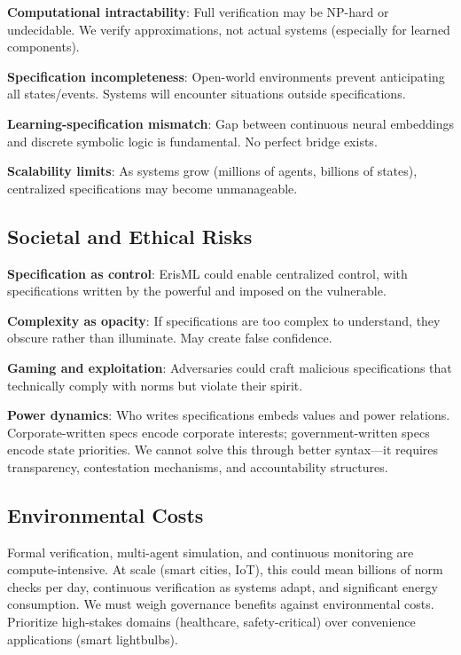 \documentclass[conference]{IEEEtran}
\begin{document}
\textbf{Computational intractability}: Full verification may be NP-hard
or undecidable. We verify approximations, not actual systems (especially
for learned components).

\textbf{Specification incompleteness}: Open-world environments prevent
anticipating all states/events. Systems will encounter situations
outside specifications.

\textbf{Learning-specification mismatch}: Gap between continuous neural
embeddings and discrete symbolic logic is fundamental. No perfect bridge
exists.

\textbf{Scalability limits}: As systems grow (millions of agents,
billions of states), centralized specifications may become unmanageable.

\subsection{Societal and Ethical Risks}

\textbf{Specification as control}: ErisML could enable centralized
control, with specifications written by the powerful and imposed on the
vulnerable.

\textbf{Complexity as opacity}: If specifications are too complex to
understand, they obscure rather than illuminate. May create false
confidence.

\textbf{Gaming and exploitation}: Adversaries could craft malicious
specifications that technically comply with norms but violate their
spirit.

\textbf{Power dynamics}: Who writes specifications embeds values and
power relations. Corporate-written specs encode corporate interests;
government-written specs encode state priorities. We cannot solve this
through better syntax---it requires transparency, contestation
mechanisms, and accountability structures.

\subsection{Environmental Costs}

Formal verification, multi-agent simulation, and continuous monitoring
are compute-intensive. At scale (smart cities, IoT), this could mean
billions of norm checks per day, continuous verification as systems
adapt, and significant energy consumption.
We must weigh governance benefits against environmental costs.
Prioritize high-stakes domains (healthcare, safety-critical) over
convenience applications (smart lightbulbs).
\end{document}
